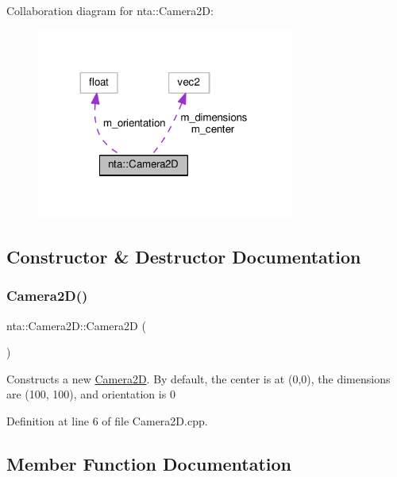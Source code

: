 Collaboration diagram for nta\+:\+:Camera2D\+:\nopagebreak
\begin{figure}[H]
\begin{center}
\leavevmode
\includegraphics[width=239pt]{d0/d63/classnta_1_1Camera2D__coll__graph}
\end{center}
\end{figure}


\subsection{Constructor \& Destructor Documentation}
\mbox{\label{classnta_1_1Camera2D_a11aada3f997c594ade11dd3c46d826f4}} 
\subsubsection{\texorpdfstring{Camera2\+D()}{Camera2D()}}
{\footnotesize\ttfamily nta\+::\+Camera2\+D\+::\+Camera2D (\begin{DoxyParamCaption}{ }\end{DoxyParamCaption})}

Constructs a new \hyperlink{classnta_1_1Camera2D}{Camera2D}. By default, the center is at (0,0), the dimensions are (100, 100), and orientation is 0 

Definition at line 6 of file Camera2\+D.\+cpp.



\subsection{Member Function Documentation}
\mbox{\label{classnta_1_1Camera2D_a8b2be32484dee689c6014cf88a6ce80a}} 
